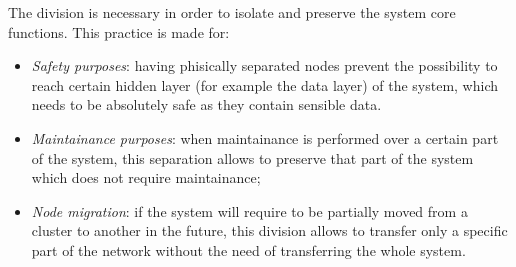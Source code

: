The division is necessary in order to isolate and preserve the system core functions. This practice is made for:
\begin{itemize}
    \item \textit{Safety purposes}: having phisically separated nodes prevent the possibility to reach certain hidden layer (for example the data layer) of the system, which needs to be absolutely safe as they contain sensible data.
    \item \textit{Maintainance purposes}: when maintainance is performed over a certain part of the system, this separation allows to preserve that part of the system which does not require maintainance;
    \item \textit{Node migration}: if the system will require to be partially moved from a cluster to another in the future, this division allows to transfer only a specific part of the network without the need of transferring the whole system.
\end{itemize}


